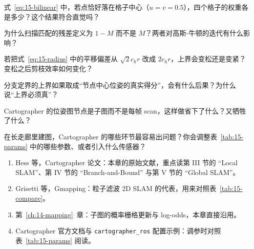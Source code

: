 \begin{problemset}
  \item 式~\eqref{eq:15-bilinear} 中，若点恰好落在格子中心（$u=v=0.5$），四个格子的权重各是多少？这个结果符合直觉吗？
  \item 为什么扫描匹配的残差定义为 $1-M$ 而不是 $M$？两者对高斯-牛顿的迭代有什么影响？
  \item 若把式~\eqref{eq:15-radius} 中的平移偏差从 $\sqrt{2}c_h r$ 改成 $2c_h r$，上界会变松还是变紧？变松之后剪枝效率如何变化？
  \item 分支定界的上界如果取成``节点中心位姿的真实得分''，会有什么后果？为什么说``上界必须真''？
  \item Cartographer 的位姿图节点是子图而不是每帧 scan，这样做省下了什么？又牺牲了什么？
  \item 在长走廊里建图，Cartographer 的哪些环节最容易出问题？你会调整表~\ref{tab:15-params} 中的哪些参数、或者引入什么传感器？
\end{problemset}

\begin{reading}
\begin{enumerate}
  \item Hess 等，Cartographer 论文\cite{hess2016cartographer}：本章的原始文献，重点读第 III 节的 ``Local SLAM''、第 IV 节的 ``Branch-and-Bound'' 与第 V 节的 ``Global SLAM''。
  \item Grisetti 等，Gmapping\cite{grisetti2007gmapping}：粒子滤波 2D SLAM 的代表，用来对照表~\ref{tab:15-compare}。
  \item 第~\ref{ch:14-mapping}~章：子图的概率栅格更新与 log-odds，本章直接沿用。
  \item Cartographer 官方文档与 \lstinline{cartographer_ros} 配置示例：调参时对照表~\ref{tab:15-params} 阅读。
\end{enumerate}

\end{reading}
